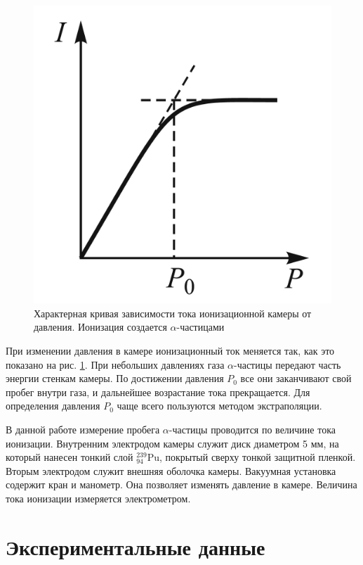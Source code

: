 \documentclass[a4paper,12pt]{article} %
\begin{document}
	\begin{figure}
		\includegraphics[width=\linewidth]{PotI}
		\caption{Характерная кривая зависимости
			тока ионизационной камеры от давления.
			Ионизация создается $ \alpha $-частицами}
		\label{ris PotI}
	\end{figure}
	
	При изменении давления в камере ионизационный ток меняется так, как это показано на рис. \ref{ris PotI}. При небольших давлениях газа
	$\alpha$-частицы передают часть энергии стенкам камеры. По достижении
	давления $ P_0 $ все они заканчивают свой пробег внутри газа, и дальнейшее возрастание тока прекращается. 
	Для определения давления $ P_0 $ чаще всего пользуются методом экстраполяции.
	
	В данной работе измерение пробега $\alpha$-частицы проводится по величине тока ионизации. Внутренним электродом
	камеры служит диск диаметром 5 мм, на который нанесен тонкий слой $ ^{239}_{94} $Pu, покрытый сверху тонкой защитной пленкой. Вторым электродом служит внешняя оболочка камеры. 
	Вакуумная установка содержит кран и манометр. Она позволяет изменять давление в камере.
	Величина тока ионизации измеряется электрометром.
	

	\section{Экспериментальные данные}
\end{document}

